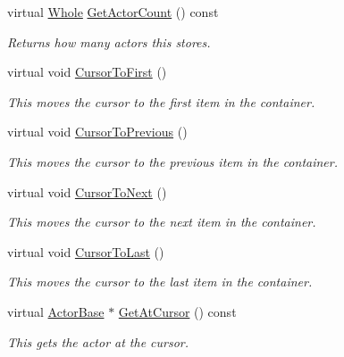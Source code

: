 \begin{DoxyCompactItemize}
virtual \hyperlink{namespacephys_a460f6bc24c8dd347b05e0366ae34f34a}{Whole} \hyperlink{classphys_1_1ActorContainerVector_a6d2e5e68e23f5798ad10ba41e479d0f7}{GetActorCount} () const 
\begin{DoxyCompactList}\small\item\em Returns how many actors this stores. \item\end{DoxyCompactList}\item 
virtual void \hyperlink{classphys_1_1ActorContainerVector_ad9c2eb2a9405dcf687c86745afc9c031}{CursorToFirst} ()
\begin{DoxyCompactList}\small\item\em This moves the cursor to the first item in the container. \item\end{DoxyCompactList}\item 
virtual void \hyperlink{classphys_1_1ActorContainerVector_ac483bcdf348f55dc8b04a8805a002413}{CursorToPrevious} ()
\begin{DoxyCompactList}\small\item\em This moves the cursor to the previous item in the container. \item\end{DoxyCompactList}\item 
virtual void \hyperlink{classphys_1_1ActorContainerVector_a1c72366a6261d8e98dc0a9d2fad9f70f}{CursorToNext} ()
\begin{DoxyCompactList}\small\item\em This moves the cursor to the next item in the container. \item\end{DoxyCompactList}\item 
virtual void \hyperlink{classphys_1_1ActorContainerVector_aa6b08266bbb57a22c07ab50514e58db4}{CursorToLast} ()
\begin{DoxyCompactList}\small\item\em This moves the cursor to the last item in the container. \item\end{DoxyCompactList}\item 
virtual \hyperlink{classphys_1_1ActorBase}{ActorBase} $\ast$ \hyperlink{classphys_1_1ActorContainerVector_a280700490b368a963dd8feae044c7a6d}{GetAtCursor} () const 
\begin{DoxyCompactList}\small\item\em This gets the actor at the cursor. \item\end{DoxyCompactList}\item 

\end{DoxyCompactItemize}
